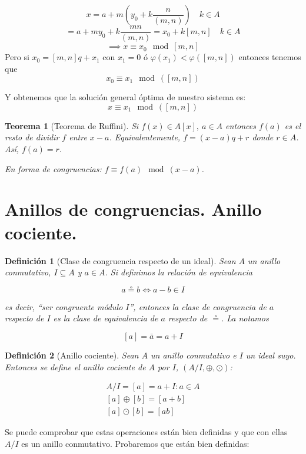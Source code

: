 \documentclass[11pt, a4paper, titlepage]{article}
\newif\IfInSansMode
\theoremstyle{theorem-style}
\newtheorem{nth}{Teorema}[section]
\theoremstyle{definition-style}
\newtheorem{ndef}{Definición}[section]
\theoremstyle{remark-style}
\theoremstyle{example-style}
\begin{document}
\[
x = a +m(y_0 +  k\frac{n}{(m,n)}) \quad k \in A
\]
\[
 = a+my_0 + k \frac{mn}{(m,n)} = x_0 +k[m,n] \quad k \in A
\]
\[
\implies x \equiv x_0 \mod [m,n]
\]
Pero si $x_0 = [m,n]q + x_1$ con $x_1 = 0 $ ó $\varphi(x_1) < \varphi([m,n])$ entonces tenemos que $$x_0 \equiv x_1 \mod([m,n])$$

Y obtenemos que la solución general óptima de nuestro sistema es:
\[
x \equiv x_1 \mod([m,n])
\]


\begin{nth}[Teorema de Ruffini]
	Si $f(x) \in A[x], \ a \in A$ entonces $f(a)$ es el resto de dividir $f$ entre $x-a$.
	Equivalentemente, $f = (x-a)q+r$ donde $r\in A$. Así, $f(a) = r$.

	En forma de congruencias: $f \equiv f(a)\mod(x-a)$.
\end{nth}
\section{Anillos de congruencias. Anillo cociente.}


\begin{ndef}[Clase de congruencia respecto de un ideal]
  Sean $A$ un anillo conmutativo, $I \subseteq A$ y $a \in A$. Si definimos la relación de equivalencia

  \[
    a \circeq b \iff a - b \in I
  \]

  es decir, ``ser congruente módulo $I$'', entonces la clase de congruencia de $a$ respecto de $I$ es la clase de equivalencia de $a$ respecto de $\circeq$. La notamos

  \[
    [a] = \bar{a} = a+I
  \]
\end{ndef}



\begin{ndef}[Anillo cociente]
  Sean $A$ un anillo conmutativo e $I$ un ideal suyo. Entonces se define el anillo cociente de $A$ por $I$, $(A/I, \oplus, \odot)$:

  \[
  \begin{array}{l}
    A/I = { [a] = a+I : a \in A} \\
    {[a]} \oplus [b] = [a+b] \\
    {[a]} \odot [b] = [ab]
  \end{array}
  \]
\end{ndef}

Se puede comprobar que estas operaciones están bien definidas y que con ellas $A/I$ es un anillo conmutativo. Probaremos que están bien definidas:
\end{document}
